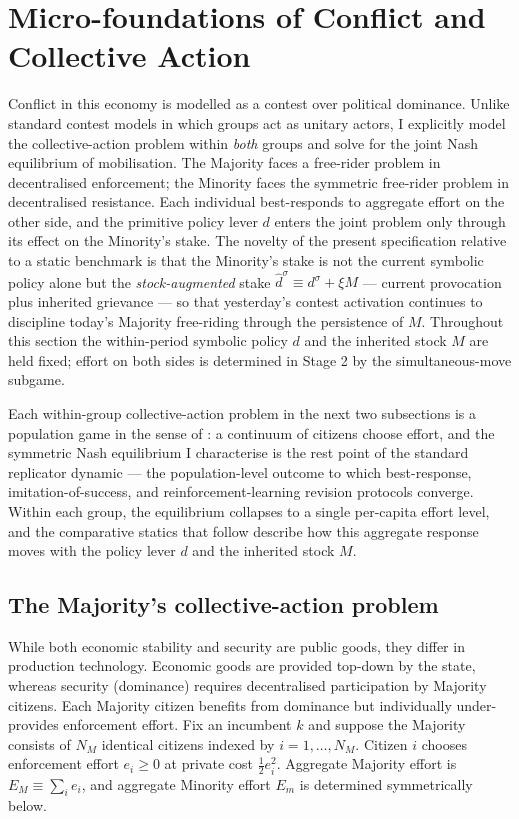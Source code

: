 \documentclass[11pt,twoside]{extarticle}
\begin{document}
\section{Micro-foundations of Conflict and Collective Action}\label{sec:contest_v2}

Conflict in this economy is modelled as a contest over political dominance. Unlike standard contest models in which groups act as unitary actors, I explicitly model the collective-action problem within \emph{both} groups and solve for the joint Nash equilibrium of mobilisation. The Majority faces a free-rider problem in decentralised enforcement; the Minority faces the symmetric free-rider problem in decentralised resistance. Each individual best-responds to aggregate effort on the other side, and the primitive policy lever $d$ enters the joint problem only through its effect on the Minority's stake. The novelty of the present specification relative to a static benchmark is that the Minority's stake is not the current symbolic policy alone but the \emph{stock-augmented} stake $\hat d^\sigma\equiv d^\sigma+\xi M$ — current provocation plus inherited grievance — so that yesterday's contest activation continues to discipline today's Majority free-riding through the persistence of $M$. Throughout this section the within-period symbolic policy $d$ and the inherited stock $M$ are held fixed; effort on both sides is determined in Stage 2 by the simultaneous-move subgame.

Each within-group collective-action problem in the next two subsections is a population game in the sense of \citet{sandholmPopulationGamesEvolutionary2010}: a continuum of citizens choose effort, and the symmetric Nash equilibrium I characterise is the rest point of the standard replicator dynamic --- the population-level outcome to which best-response, imitation-of-success, and reinforcement-learning revision protocols converge. Within each group, the equilibrium collapses to a single per-capita effort level, and the comparative statics that follow describe how this aggregate response moves with the policy lever $d$ and the inherited stock $M$.

\subsection{The Majority's collective-action problem}

While both economic stability and security are public goods, they differ in production technology. Economic goods are provided top-down by the state, whereas security (dominance) requires decentralised participation by Majority citizens. Each Majority citizen benefits from dominance but individually under-provides enforcement effort. Fix an incumbent $k$ and suppose the Majority consists of $N_M$ identical citizens indexed by $i=1,\dots,N_M$. Citizen $i$ chooses enforcement effort $e_i\ge 0$ at private cost $\tfrac{1}{2}e_i^2$. Aggregate Majority effort is $E_M\equiv\sum_i e_i$, and aggregate Minority effort $E_m$ is determined symmetrically below.
\end{document}
